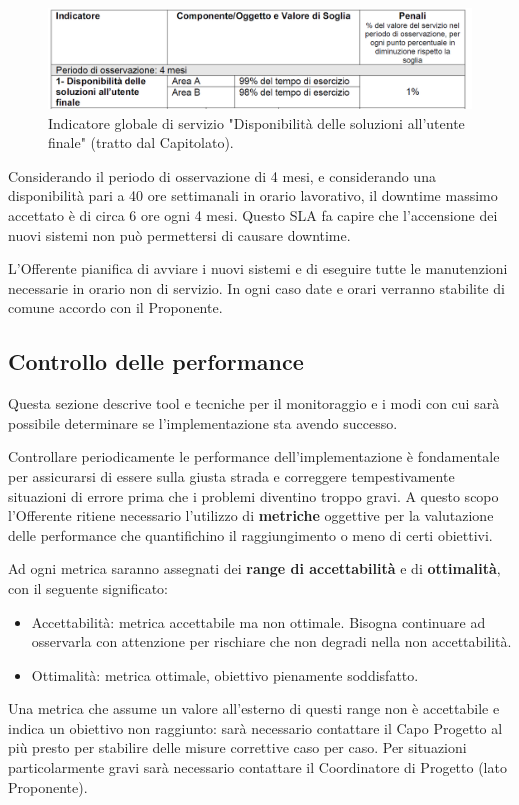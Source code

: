                 \begin{figure}[H]
				\centering
				\includegraphics[scale=0.4]{immagini/rollout/sla1}
				\caption{Indicatore globale di servizio "Disponibilità delle soluzioni all'utente finale" (tratto dal Capitolato).}
				\end{figure}
                Considerando il periodo di osservazione di 4 mesi, e considerando una disponibilità pari a 40 ore settimanali in orario lavorativo, il downtime massimo accettato è di circa 6 ore ogni 4 mesi. Questo SLA fa capire che l'accensione dei nuovi sistemi non può permettersi di causare downtime.
                
                
                L'Offerente pianifica di avviare i nuovi sistemi e di eseguire tutte le manutenzioni necessarie in orario non di servizio. In ogni caso date e orari verranno stabilite di comune accordo con il Proponente.
                
		\subsection{Controllo delle performance}
        	Questa sezione descrive tool e tecniche per il monitoraggio e i modi con cui sarà possibile determinare se l'implementazione sta avendo successo.   
            
            
            Controllare periodicamente le performance dell'implementazione è fondamentale per assicurarsi di essere sulla giusta strada e correggere tempestivamente situazioni di errore prima che i problemi diventino troppo gravi. A questo scopo l'Offerente ritiene necessario l'utilizzo di \textbf{metriche} oggettive per la valutazione delle performance che quantifichino il raggiungimento o meno di certi obiettivi.
            
            
            Ad ogni metrica saranno assegnati dei \textbf{range di accettabilità} e di \textbf{ottimalità}, con il seguente significato:
            \begin{itemize}
            	\item Accettabilità: metrica accettabile ma non ottimale. Bisogna continuare ad osservarla con attenzione per rischiare che non degradi nella non accettabilità.
                \item Ottimalità: metrica ottimale, obiettivo pienamente soddisfatto.
            \end{itemize}
            Una metrica che assume un valore all'esterno di questi range non è accettabile e indica un obiettivo non raggiunto: sarà necessario contattare il Capo Progetto al più presto per stabilire delle misure correttive caso per caso. Per situazioni particolarmente gravi sarà necessario contattare il Coordinatore di Progetto (lato Proponente).
            

